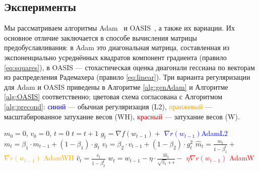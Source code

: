 \subsection{Эксперименты}
\label{Experiments}

Мы рассматриваем алгоритмы Adam~\citep{kingma2014adam} и OASIS~\citep{jahani2021doubly}, а также их вариации. Их основное отличие заключается в способе вычисления матрицы предобуславливания: в Adam это диагональная матрица, составленная из экспоненциально усреднённых квадратов компонент градиента (правило \eqref{eq:squares}), в OASIS --- стохастическая оценка диагонали гессиана по векторам из распределения Радемахера (правило \eqref{eq:linear}). Три варианта регуляризации для Adam и OASIS приведены в Алгоритме \ref{alg:genAdam} и Алгоритме \ref{alg:OASIS} соответственно; цветовая схема согласована с Алгоритмом \ref{alg:precond}: \textcolor{blue}{синий} --- обычная регуляризация (L2), \textcolor{orange}{оранжевый} --- масштабированное затухание весов (WH), \textcolor{red}{красный} --- затухание весов (W).

\begin{algorithm}[H]
            \caption{Различные способы добавления регуляризации для Adam}
            \label{alg:genAdam}
            \begin{algorithmic}
            \small{
            \State $m_0 = 0$, $v_0 = 0$, $t = 0$
            \State $t = t+1$
            \State $g_t = \nabla f(w_{t-1}) + $ \textcolor{blue}{$\nabla r(w_{t-1})$}\hfill \textcolor{blue}{AdamL2}
            \State $m_t = \beta_1 \cdot m_{t-1} + (1 - \beta_1) \cdot g_t$
            \State $v_t = \beta_2 \cdot v_{t-1} + (1 - \beta_2) \cdot g_t^2$
            \State $\hat{m}_t = \frac{m_t}{1-\beta_1^t} +$ \textcolor{orange}{$\nabla r(w_{t-1})$} \hfill \textcolor{orange}{AdamWH}
            \State $\hat{v}_t = \frac{v_t}{1-\beta_2^t}$
            \State $w_t = w_{t-1} - \eta \cdot \frac{\hat{m}_t}{\sqrt{\hat{v}_t} + \epsilon} - $ \textcolor{red}{$\eta \nabla r(w_{t-1})$ } \hfill \textcolor{red}{AdamW}
            \EndWhile
            }
\end{algorithmic}
\end{algorithm}

